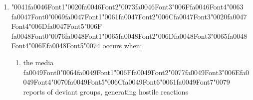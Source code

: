\documentclass[12pt]{article}
\begin{document}
\begin{enumerate}[label=\arabic*.]
\begin{enumerate}[label=(\alph*)]
    \item audiences {\csname fa0043Font0\endcsname\char"0061}{\csname fa0043Font1\endcsname\char"0063}{\csname fa0043Font2\endcsname\char"0074}{\char"0069}{\char"0076}{\char"0065}{\char"006C}{\char"0079} {\csname fa0044Font0\endcsname\char"0020}{\csname fa0044Font1\endcsname\char"0063}{\csname fa0044Font2\endcsname\char"0072}{\csname fa0044Font3\endcsname\char"0069}{\csname fa0044Font4\endcsname\char"0074}{\csname fa0044Font5\endcsname\char"0069}{\csname fa0044Font6\endcsname\char"0071}{\csname fa0044Font7\endcsname\char"0075}{\csname fa0044Font8\endcsname\char"0065} whatever messages they are given
    \item social interaction {\csname fa0045Font0\endcsname\char"0063}{\csname fa0045Font1\endcsname\char"0068}{\csname fa0045Font2\endcsname\char"0061}{\csname fa0045Font3\endcsname\char"006C}{\csname fa0045Font4\endcsname\char"006C}{\csname fa0045Font5\endcsname\char"0065}{\csname fa0045Font6\endcsname\char"006E}{\csname fa0045Font7\endcsname\char"0067}{\char"0065}{\char"0073} the ideas and images that audiences select
\end{enumerate}
\item {\char"0041}{\csname fa0046Font1\endcsname\char"0020}{\csname fa0046Font2\endcsname\char"0073}{\csname fa0046Font3\endcsname\char"006F}{\csname fa0046Font4\endcsname\char"0063} {\csname fa0047Font0\endcsname\char"0069}{\csname fa0047Font1\endcsname\char"0061}{\csname fa0047Font2\endcsname\char"006C}{\csname fa0047Font3\endcsname\char"0020}{\csname fa0047Font4\endcsname\char"006D}{\csname fa0047Font5\endcsname\char"006F} {\csname fa0048Font0\endcsname\char"0076}{\csname fa0048Font1\endcsname\char"0065}{\csname fa0048Font2\endcsname\char"006D}{\csname fa0048Font3\endcsname\char"0065}{\csname fa0048Font4\endcsname\char"006E}{\csname fa0048Font5\endcsname\char"0074} occurs when:
\begin{enumerate}[label=(\alph*)]
    \item the media {\csname fa0049Font0\endcsname\char"0064}{\csname fa0049Font1\endcsname\char"006F}{\csname fa0049Font2\endcsname\char"0077}{\csname fa0049Font3\endcsname\char"006E}{\csname fa0049Font4\endcsname\char"0070}{\csname fa0049Font5\endcsname\char"006C}{\csname fa0049Font6\endcsname\char"0061}{\csname fa0049Font7\endcsname\char"0079} reports of deviant groups, generating hostile reactions

\end{enumerate}
\end{enumerate}
\end{document}
